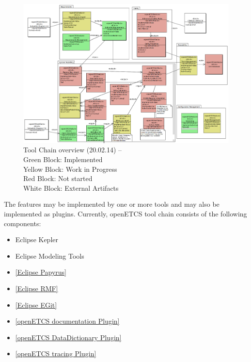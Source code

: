 \begin{figure}[htbp]
\includegraphics[width=\textwidth]{ToolChainmodel}
\caption{\label{fig:overview} Tool Chain overview (20.02.14) -- \\
  Green Block: Implemented \\
  Yellow Block: Work in Progress \\
  Red Block: Not started \\
  White Block: External Artifacts} 
\end{figure}
The features may be implemented by one or more tools and may also be implemented as plugins.
Currently, openETCS tool chain consists of the following components:
\begin{itemize}
\item Eclipse Kepler
\item Eclipse Modeling Tools
\item \href{http://www.eclipse.org/papyrus/}{[Eclipse Papyrus]}  
\item \href{http://eclipse.org/rmf/}{[Eclipse RMF]}
\item \href{http://www.eclipse.org/egit/}{[Eclipse EGit]}
\item \href{https://github.com/openETCS/toolchain/wiki/User-Documentation#Generating_Documentation}{[openETCS documentation Plugin]}
\item \href{https://github.com/openETCS/toolchain/wiki/Data-Dictionary-Plugin}{[openETCS DataDictionary Plugin]} 
\item \href{https://github.com/openETCS/toolchain/wiki/User-Documentation#Tracing_Requirements_and_SysML_Models}{[openETCS tracing Plugin]} 
\end{itemize}

